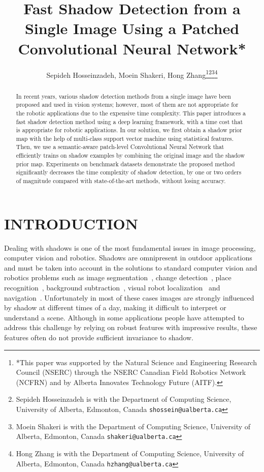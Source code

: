 \documentclass[letterpaper, 10 pt, conference]{ieeeconf}
\title{\LARGE \bf
Fast Shadow Detection from a Single Image Using a Patched Convolutional Neural Network*
}
\author{Sepideh Hosseinzadeh, Moein Shakeri, Hong Zhang\thanks{*This paper was supported by the Natural Science and Engineering Research Council (NSERC) through the NSERC Canadian Field Robotics Network (NCFRN) and by Alberta Innovates Technology Future (AITF).}\thanks{Sepideh Hosseinzadeh is with the Department of Computing Science, University of Alberta, Edmonton, Canada
        {\tt\small shossein@ualberta.ca}}\thanks{Moein Shakeri is with the Department of Computing Science, University of Alberta, Edmonton, Canada
        {\tt\small shakeri@ualberta.ca}}\thanks{Hong Zhang is with the Department of Computing Science, University of Alberta, Edmonton, Canada
        {\tt\small hzhang@ualberta.ca}}}
\begin{document}
\maketitle
\thispagestyle{empty}
\pagestyle{empty}


\begin{abstract}
In recent years, various shadow detection methods from a single image have been proposed and used in vision systems; however, most of them are not appropriate for the robotic applications due to the expensive time complexity. This paper introduces a fast shadow detection method using a deep learning framework, with a time cost that is appropriate for robotic applications. In our solution, we first obtain a shadow prior map with the help of multi-class support vector machine using statistical features. Then, we use a semantic-aware
patch-level Convolutional Neural Network that efficiently trains on shadow examples by combining the original image and the shadow prior map. Experiments on benchmark datasets demonstrate the proposed method significantly decreases the time complexity of shadow detection, by one or two orders of magnitude compared with state-of-the-art methods, without losing accuracy.  

\end{abstract}


\section{INTRODUCTION}

Dealing with shadows is one of the most fundamental issues in image processing, computer vision and robotics. Shadows are omnipresent in outdoor applications and must be taken into account in the solutions to standard computer vision and robotics problems such as image segmentation~\cite{segment}, change detection~\cite{shakeri_ICCV}, place recognition~\cite{place_rec}, background subtraction~\cite{shakeri_small,shakeri_corola}, visual robot localization~\cite{Corke,shakeri_dynamic} and navigation~\cite{Maddern}. Unfortunately in most of these cases images are strongly influenced by shadow at different times of a day, making it difficult to interpret or understand a scene. Although in some applications people have attempted to address this challenge by relying on robust features with impressive results, these features often do not provide sufficient invariance to shadow.
\end{document}
